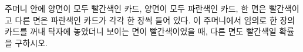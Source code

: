 주머니 안에 양면이 모두 빨간색인 카드, 양면이 모두 파란색인 카드, 한 면은 빨간색이고 다른 면은 파란색인 카드가 각각 한 장씩 들어 있다. 이 주머니에서 임의로 한 장의 카드를 꺼내 탁자에 놓았더니 보이는 면이 빨간색이었을 때, 다른 면도 빨간색일 확률을 구하시오.
